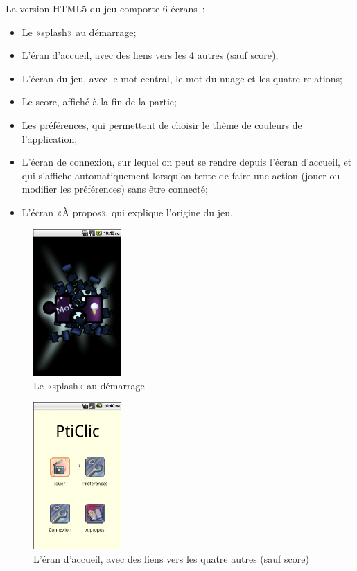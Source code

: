 \documentclass[a4paper,11pt,french]{article}
\begin{document}
La version HTML5 du jeu  comporte 6 écrans~:
\begin{itemize}
\item Le «splash» au démarrage;
\item L'éran d'accueil, avec des liens vers les 4 autres (sauf score);
\item L'écran du jeu, avec le mot central, le mot du nuage et les quatre relations;
\item Le score, affiché à la fin de la partie;
\item Les préférences, qui permettent de choisir le thème de couleurs de l'application;
\item L'écran de connexion, sur lequel on peut se rendre depuis l'écran d'accueil, et qui s'affiche automatiquement lorsqu'on tente de faire
  une action (jouer ou modifier les préférences) sans être connecté;
\item L'écran «À propos», qui explique l'origine du jeu.
\end{itemize}



\begin{figure}[h!]
  \centering
      \includegraphics[width=0.3\textwidth]{img/phone-splash.png}
  \caption{Le «splash» au démarrage}
\end{figure}

\begin{figure}[h!]
  \centering
      \includegraphics[width=0.3\textwidth]{img/phone-frontpage-deco.png}
  \caption{L'éran d'accueil, avec des liens vers les quatre autres (sauf score)}
\end{figure}
\end{document}
